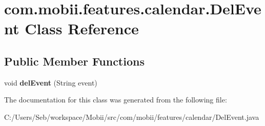 \hypertarget{classcom_1_1mobii_1_1features_1_1calendar_1_1_del_event}{\section{com.\-mobii.\-features.\-calendar.\-Del\-Event Class Reference}
\label{classcom_1_1mobii_1_1features_1_1calendar_1_1_del_event}
}
\subsection*{Public Member Functions}
\begin{DoxyCompactItemize}
\item 
\hypertarget{classcom_1_1mobii_1_1features_1_1calendar_1_1_del_event_aff18c291611b63872a68425529911bb7}{void {\bfseries del\-Event} (String event)}\label{classcom_1_1mobii_1_1features_1_1calendar_1_1_del_event_aff18c291611b63872a68425529911bb7}

\end{DoxyCompactItemize}


The documentation for this class was generated from the following file\-:\begin{DoxyCompactItemize}
\item 
C\-:/\-Users/\-Seb/workspace/\-Mobii/src/com/mobii/features/calendar/Del\-Event.\-java\end{DoxyCompactItemize}
